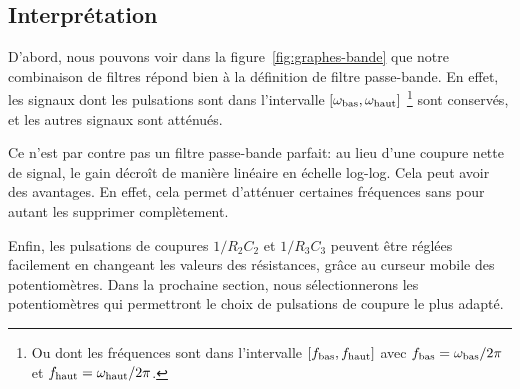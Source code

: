 \subsection{Interprétation}

D'abord, nous pouvons voir dans la figure~\ref{fig:graphes-bande}
que notre combinaison de filtres répond bien à la définition de
filtre passe-bande.
En effet, les signaux dont les pulsations sont dans l'intervalle
$[\omega_{\mathrm{bas}},\omega_{\mathrm{haut}}]$
\footnote{
    Ou dont les fréquences sont dans l'intervalle
    $[f_{\mathrm{bas}},f_{\mathrm{haut}}]$ avec
    $f_{\mathrm{bas}} = \omega_{\mathrm{bas}}/2\pi$ et
    $f_{\mathrm{haut}} = \omega_{\mathrm{haut}}/2\pi$.
}
sont conservés, et les autres signaux sont atténués.

Ce n'est par contre pas un filtre passe-bande parfait:
au lieu d'une coupure nette de signal, le gain décroît
de manière linéaire en échelle log-log.
Cela peut avoir des avantages.
En effet, cela permet d'atténuer certaines fréquences sans pour autant
les supprimer complètement.

Enfin, les pulsations de coupures $1/R_2C_2$ et $1/R_3C_3$
peuvent être réglées facilement en changeant les valeurs des résistances,
grâce au curseur mobile des potentiomètres.
Dans la prochaine section, nous sélectionnerons les potentiomètres
qui permettront le choix de pulsations de coupure
le plus adapté.
